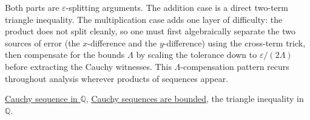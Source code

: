 \begin{remark*}
Both parts are $\varepsilon$-splitting arguments.  The addition case is a
direct two-term triangle inequality.  The multiplication case adds one
layer of difficulty: the product does not split cleanly, so one must first
algebraically separate the two sources of error (the $x$-difference and
the $y$-difference) using the cross-term trick, then compensate for the
bounds $\Lambda$ by scaling the tolerance down to $\varepsilon/(2\Lambda)$
before extracting the Cauchy witnesses.  This $\Lambda$-compensation pattern
recurs throughout analysis wherever products of sequences appear.
\end{remark*}

\begin{dependencies}
\hyperref[def:cauchy-rational]{Cauchy sequence in $\mathbb{Q}$},
\hyperref[thm:cauchy-bounded-q]{Cauchy sequences are bounded},
the triangle inequality in $\mathbb{Q}$.
\end{dependencies}

\clearpage
